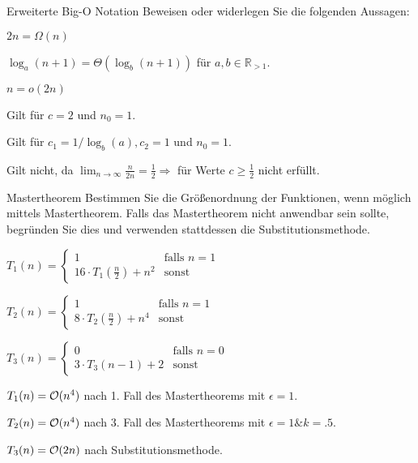 \documentclass{article}
\begin{document}
\begin{eexercises}{Erweiterte Big-O Notation}{
    Beweisen oder widerlegen Sie die folgenden Aussagen:
  }
  \item $2n = \Omega(n)$
  \item $\log_a(n+1) = \Theta(\log_b(n+1))$ für $a,b \in \mathbb{R}_{>1}$.
  \item $n = o(2n)$
\end{eexercises}

\begin{solutions}
  \item Gilt für $c = 2$ und $n_0 = 1$.
  \item Gilt für $c_1=1/\log_b(a), c_2=1$ und $n_0 = 1$.
  \item Gilt nicht, da $\lim_{n\to\infty} \frac{n}{2n} = \frac{1}{2} \Rightarrow $ für Werte $c\geq\frac{1}{2}$ nicht erfüllt.
\end{solutions}

\begin{eexercises}{Mastertheorem}{
    Bestimmen Sie die Größenordnung der Funktionen, wenn möglich mittels Mastertheorem. Falls das Mastertheorem nicht anwendbar sein sollte, begründen Sie dies und verwenden stattdessen die Substitutionsmethode.
  }
  \item $T_1(n) = \begin{cases}
      1                               & \text{falls } n = 1 \\
      16 \cdot T_1(\frac{n}{2}) + n^2 & \text{sonst}
    \end{cases}$
  \item $T_2(n) = \begin{cases}
      1                              & \text{falls } n = 1 \\
      8 \cdot T_2(\frac{n}{2}) + n^4 & \text{sonst}
    \end{cases}$
  \item $T_3(n) = \begin{cases}
      0                    & \text{falls } n = 0 \\
      3 \cdot T_3(n-1) + 2 & \text{sonst}
    \end{cases}$
\end{eexercises}

\begin{solutions}
  \item $T_1(n) = \mathcal{O}(n^4)$ nach 1. Fall des Mastertheorems mit $\epsilon=1$.
  \item $T_2(n) = \mathcal{O}(n^4)$ nach 3. Fall des Mastertheorems mit $\epsilon=1 \& k=.5$.
  \item $T_3(n) = \mathcal{O}(2n)$ nach Substitutionsmethode.
\end{solutions}
\end{document}
